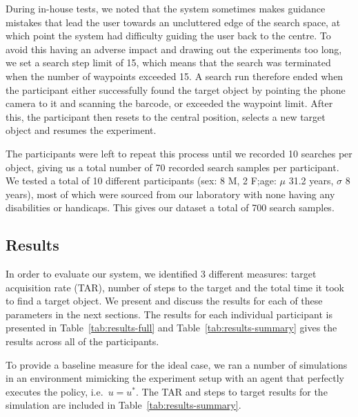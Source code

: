 \documentclass[a4paper, twoside]{article}
\begin{document}
During in-house tests, we noted that the system sometimes makes guidance mistakes that lead the user towards an uncluttered edge of the search space, at which point the system had difficulty guiding the user back to the centre. To avoid this having an adverse impact and drawing out the experiments too long, we set a search step limit of 15, which means that the search was terminated when the number of waypoints exceeded 15. A search run therefore ended when the participant either successfully found the target object by pointing the phone camera to it and scanning the barcode, or exceeded the waypoint limit. After this, the participant then resets to the central position, selects a new target object and resumes the experiment.

The participants were left to repeat this process until we recorded 10 searches per object, giving us a total number of 70 recorded search samples per participant. We tested a total of 10 different participants (sex: 8 M, 2 F;\@ age: $\mu$ 31.2 years, $\sigma$ 8 years), most of which were sourced from our laboratory with none having any disabilities or handicaps. This gives our dataset a total of 700 search samples.

\subsection{Results}

\noindent In order to evaluate our system, we identified 3 different measures: target acquisition rate (TAR), number of steps to the target and the total time it took to find a target object. We present and discuss the results for each of these parameters in the next sections. The results for each individual participant is presented in Table~\ref{tab:results-full} and Table~\ref{tab:results-summary} gives the results across all of the participants. 

To provide a baseline measure for the ideal case, we ran a number of simulations in an environment mimicking the experiment setup with an agent that perfectly executes the policy, i.e.\ $u=u^*$. The TAR and steps to target results for the simulation are included in Table~\ref{tab:results-summary}.
\end{document}

